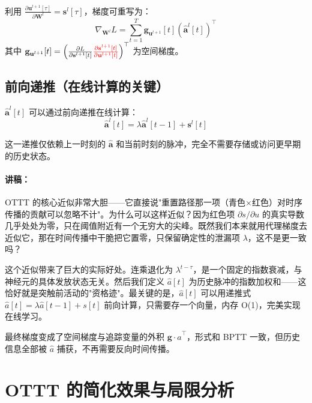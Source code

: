 \documentclass[journal,12pt,onecolumn]{IEEEtran}
\begin{document}
利用 $\frac{\partial \mathbf{u}^{l+1}[\tau]}{\partial \mathbf{W}^l} = \mathbf{s}^{l}[\tau]$，梯度可重写为：
\begin{equation}
\nabla_{\mathbf{W}^l}L = \sum_{t=1}^T \mathbf{g}_{\mathbf{u}^{l+1}}[t] \left(\hat{\mathbf{a}}^{l}[t]\right)^\top
\label{eq.ottt_final}
\end{equation}
其中 $\mathbf{g}_{\mathbf{u}^{l+1}}[t] = \left( \frac{\partial L}{\partial \mathbf{s}^{l+1}[t]} {\color{red}{\frac{\partial \mathbf{s}^{l+1}[t]}{\partial \mathbf{u}^{l+1}[t]}}} \right)^\top$ 为空间梯度。

\subsection*{前向递推（在线计算的关键）}

$\hat{\mathbf{a}}^{l}[t]$ 可以通过前向递推在线计算：
\begin{equation}
\boxed{
\hat{\mathbf{a}}^{l}[t] = \lambda \hat{\mathbf{a}}^{l}[t-1] + \mathbf{s}^{l}[t]
}
\label{eq.ottt_recurrence}
\end{equation}

这一递推仅依赖上一时刻的 $\hat{\mathbf{a}}$ 和当前时刻的脉冲，完全不需要存储或访问更早期的历史状态。

\paragraph{讲稿：}
OTTT 的核心近似非常大胆——它直接说"重置路径那一项（青色×红色）对时序传播的贡献可以忽略不计"。为什么可以这样近似？因为红色项 $\partial s / \partial u$ 的真实导数几乎处处为零，只在阈值附近有一个无穷大的尖峰。既然我们本来就用代理梯度去近似它，那在时间传播中干脆把它置零，只保留确定性的泄漏项 $\lambda$，这不是更一致吗？

这个近似带来了巨大的实际好处。连乘退化为 $\lambda^{t-\tau}$，是一个固定的指数衰减，与神经元的具体发放状态无关。然后我们定义 $\hat{a}[t]$ 为历史脉冲的指数加权和——这恰好就是突触前活动的"资格迹"。最关键的是，$\hat{a}[t]$ 可以用递推式 $\hat{a}[t] = \lambda \hat{a}[t-1] + s[t]$ 前向计算，只需要存一个向量，内存 O(1)，完美实现在线学习。

最终梯度变成了空间梯度与追踪变量的外积 $\mathbf{g} \cdot \hat{a}^\top$，形式和 BPTT 一致，但历史信息全部被 $\hat{a}$ 捕获，不再需要反向时间传播。

\section{OTTT 的简化效果与局限分析}
\end{document}
